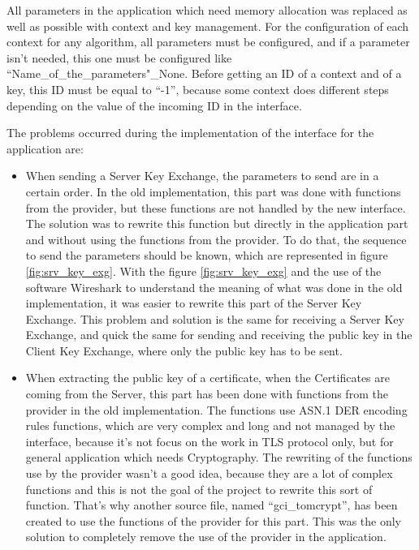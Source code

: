 All parameters in the application which need memory allocation was replaced as
well as possible with context and key management.
For the configuration of each context for any algorithm, all parameters must be
configured, and if a parameter isn't needed, this one must be configured like
``Name\_of\_the\_parameters"\_None.
Before getting an ID of a context and of a key, this ID must be equal to ``-1'',
because some context does different steps depending on the value of the incoming
ID in the interface.


The problems occurred during the implementation of the interface for the \embtls
application are:
\begin{itemize}
  \item When sending a Server Key Exchange, the parameters to send are in a
  certain order. In the old implementation, this part was
  done with functions from the provider, but these functions are not
  handled by the new interface. The solution was to rewrite this function
  but directly in the application part and without using the functions from the
  provider. To do that, the sequence to send the parameters should be known,
  which are represented in figure \ref{fig:srv_key_exg}. With the figure \ref{fig:srv_key_exg}
  and the use of the software Wireshark to understand the meaning of what was done in the
  old implementation, it was easier to rewrite this part of the Server Key Exchange.
  This problem and solution is the same for receiving a Server Key Exchange, and
  quick the same for sending and receiving the public key in the Client Key
  Exchange, where only the public key has to be sent.
  \item When extracting the public key of a certificate, when the
  Certificates are coming from the Server, this part has been done with
  functions from the provider in the old implementation. The functions use
  ASN.1 DER encoding rules \cite{rec:der} functions, which are very complex and
  long and not managed by the interface, because it's not focus on the
  work in TLS protocol only, but for general application which needs
  Cryptography. The rewriting of the functions use by the provider wasn't
  a good idea, because they are a lot of complex functions and this is not the
  goal of the project to rewrite this sort of function.
  That's why another source file, named ``gci\_tomcrypt'', has been created to
  use the functions of the provider for this part.
  This was the only solution to  completely remove the use of the provider in
  the application.
\end{itemize}


